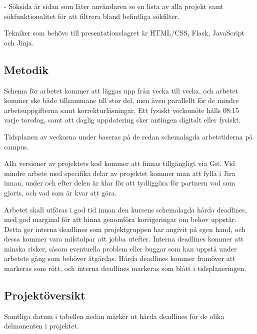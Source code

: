 \documentclass{mall}
\begin{document}
- Söksida är sidan som låter användaren se en lista av alla projekt samt sökfunktionalitet för att filtrera bland befintliga sökfilter.

Tekniker som behövs till presentationslagret är HTML/CSS, Flask, JavaScript och Jinja.

\pagebreak

\subsection*{Metodik}

 Schema för arbetet kommer att läggas upp från vecka till vecka, och arbetet kommer ske både tillsammans till stor del, men även parallellt för de mindre arbetsuppgifterna samt korrekturläsningar. Ett fysiskt veckomöte hålls 08:15 varje torsdag, samt att daglig uppdatering sker antingen digitalt eller fysiskt.

 Tidsplanen av veckorna under baseras på de redan schemalagda arbetstiderna på campus.

Alla versioner av projektets kod kommer att finnas tillgängligt via Git. Vid mindre arbete med specifika delar av projektet kommer man att fylla i Jira innan, under och efter delen är klar för att tydliggöra för partnern vad som gjorts, och vad som är kvar att göra.

 Arbetet skall utföras i god tid innan den kursens schemalagda hårda deadlines, med god marginal för att hinna genomföra korrigeringar om behov uppstår. Detta ger interna deadlines som projektgruppen har angivit på egen hand, och dessa kommer vara milstolpar att jobba utefter. Interna deadlines kommer att minska risker, såsom eventuella problem eller buggar som kan uppstå under arbetets gång som behöver åtgärdas. Hårda deadlines kommer framöver att markeras som rött, och interna deadlines markeras som blått i tidsplaneringen.

\subsection*{Projektöversikt}
 Samtliga datum i tabellen nedan märker ut hårda deadlines för de olika delmonenten i projektet.
\end{document}
